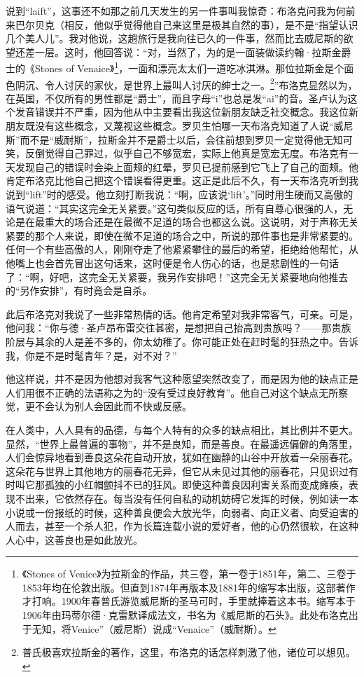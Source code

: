 \par 说到“laift”，这事还不如那之前几天发生的另一件事叫我惊奇：布洛克问我为何前来巴尔贝克（相反，他似乎觉得他自己来这里是极其自然的事），是不是“指望认识几个美人儿”。我对他说，这趟旅行是我向往已久的一件事，然而比去威尼斯的欲望还差一层。这时，他回答说：“对，当然了，为的是一面装做读约翰·拉斯金爵士的《Stones of Venaice》\footnote{《Stones of Venice》为拉斯金的作品，共三卷，第一卷于1851年，第二、三卷于1853年均在伦敦出版。但直到1874年再版本及1881年的缩写本出版，这部著作才打响。1900年春普氏游览威尼斯的圣马可时，手里就捧着这本书。缩写本于1906年由玛蒂尔德·克雷默译成法文，书名为《威尼斯的石头》。此处布洛克出于无知，将Venice”（威尼斯）说成“Venaice”（威耐斯）。}，一面和漂亮太太们一道吃冰淇淋。那位拉斯金是个面色阴沉、令人讨厌的家伙，是世界上最叫人讨厌的绅士之一。\footnote{普氏极喜欢拉斯金的著作，这里，布洛克的话怎样刺激了他，诸位可以想见。}”布洛克显然以为，在英国，不仅所有的男性都是“爵士”，而且字母“i”也总是发“ai”的音。圣卢认为这个发音错误并不严重，因为他从中主要看出我这位新朋友缺乏社交概念。我这位新朋友既没有这些概念，又蔑视这些概念。罗贝生怕哪一天布洛克知道了人说“威尼斯”而不是“威耐斯”，拉斯金并不是爵士以后，会往前想到罗贝一定觉得他无知可笑，反倒觉得自己罪过，似乎自己不够宽宏，实际上他真是宽宏无度。布洛克有一天发现自己的错误时会染上面颊的红晕，罗贝已提前感到它飞上了自己的面颊。他肯定布洛克比他自己把这个错误看得更重。这正是此后不久，有一天布洛克听到我说到“lift”时的感受。他立刻打断我说：“啊，应该说‘lift’。”同时用生硬而又高傲的语气说道：“其实这完全无关紧要。”这句类似反应的话，所有自尊心很强的人，无论是在最重大的场合还是在最微不足道的场合也都这么说。这说明，对于声称无关紧要的那个人来说，即使在微不足道的场合之中，所说的那件事也是非常紧要的。任何一个有些高傲的人，刚刚夺走了他紧紧攀住的最后的希望，拒绝给他帮忙，从他嘴上也会首先冒出这句话来，这时便是令人伤心的话，也是悲剧性的一句话了：“啊，好吧，这完全无关紧要，我另作安排吧！”这完全无关紧要地向他推去的“另作安排”，有时竟会是自杀。
\par 此后布洛克对我说了一些非常热情的话。他肯定希望对我非常客气，可亲。可是，他问我：“你与德·圣卢昂布雷交往甚密，是想把自己抬高到贵族吗？——那贵族阶层与其余的人是差不多的，你太幼稚了。你可能正处在赶时髦的狂热之中。告诉我，你是不是时髦青年？是，对不对？”
\par 他这样说，并不是因为他想对我客气这种愿望突然改变了，而是因为他的缺点正是人们用很不正确的法语称之为的“没有受过良好教育”。他自己对这个缺点无所察觉，更不会认为别人会因此而不快或反感。
\par 在人类中，人人具有的品德，与每个人特有的众多的缺点相比，其比例并不更大。显然，“世界上最普遍的事物”，并不是良知，而是善良。在最遥远偏僻的角落里，人们会惊异地看到善良这朵花自动开放，犹如在幽静的山谷中开放着一朵丽春花。这朵花与世界上其他地方的丽春花无异，但它从未见过其他的丽春花，只见识过有时叫它那孤独的小红帽颤抖不已的狂风。即使这种善良因利害关系而变成瘫痪，表现不出来，它依然存在。每当没有任何自私的动机妨碍它发挥的时候，例如读一本小说或一份报纸的时候，这种善良便会大放光华，向弱者、向正义者、向受迫害的人而去，甚至一个杀人犯，作为长篇连载小说的爱好者，他的心仍然很软，在这种人心中，这善良也是如此放光。
